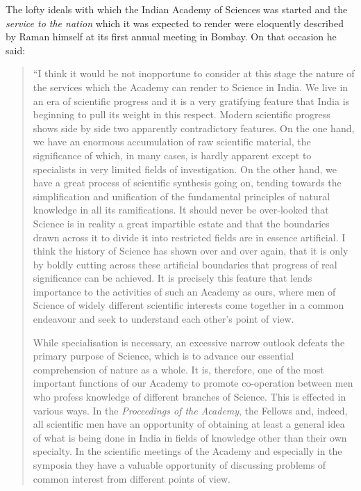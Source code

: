 The lofty ideals with which the Indian Academy of Sciences was started and the {\em service to the nation} which it was expected to \hbox{render} were eloquently described by Raman himself at its first annual meeting in Bombay. On that occasion he said:
\begin{quote}
{\fontsize{10pt}{12pt}\selectfont
``I think it would be not inopportune to consider at this stage the nature of the services which the Academy can render to Science in India. We live in an era of scientific progress and it is a very gratifying feature that India is beginning to pull its weight in this respect. Modern scientific progress shows side by side two apparently contradictory features. On the one hand, we have an enormous accumulation of raw scientific material, the significance of which, in many cases, is hardly apparent except to specialists in very limited fields of investigation. On the other hand, we have a great process of scientific synthesis going on, tending towards the simplification and unification of the fundamental principles of natural knowledge in all its ramifications. It should never be over-looked that Science is in reality a great impartible estate and that the boundaries drawn across it to divide it into restricted fields are in essence artificial. I think the history of Science has shown over and over again, that it is only by boldly cutting across these artificial boundaries that progress of real significance can be achieved. It is precisely this feature that lends importance to the activities of such an Academy as ours, where men of Science of widely different scientific interests come together in a common endeavour and seek to understand each other's point of view.

While specialisation is necessary, an excessive narrow outlook defeats the primary purpose of Science, which is to advance our essential comprehension of nature as a whole. It is, therefore, one of the most important functions of our Academy to promote co-operation between men who profess knowledge of different branches of Science. This is effected in various ways. In the {\em Proceedings of the Academy}, the Fellows and, indeed, all scientific men have an opportunity of obtaining at least a general idea of what is being done in India in fields of knowledge other than their own specialty. In the scientific meetings of the Academy and especially in the symposia they have a valuable opportunity of discussing problems of common interest from different points of view.

}
\end{quote}
